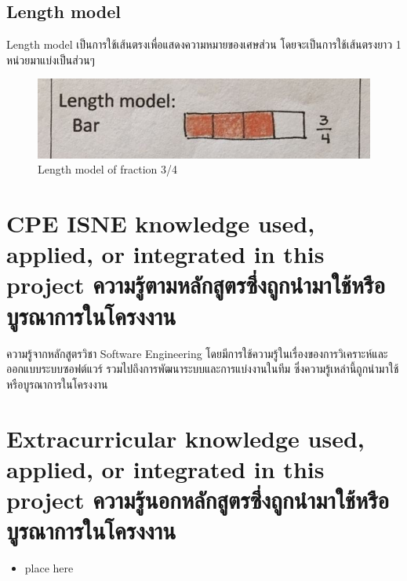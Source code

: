 \subsection{Length model}
Length model เป็นการใช้เส้นตรงเพื่อแสดงความหมายของเศษส่วน โดยจะเป็นการใช้เส้นตรงยาว 1 หน่วยมาแบ่งเป็นส่วนๆ
\begin{figure}[h!tbp]
\begin{center}
\includegraphics{Length_model.png}
\end{center}
\caption[Length model]{Length model of fraction 3/4}
\end{figure}




\section{\ifenglish%
\ifcpe CPE \else ISNE \fi knowledge used, applied, or integrated in this project
\else%
ความรู้ตามหลักสูตรซึ่งถูกนำมาใช้หรือบูรณาการในโครงงาน
\fi
}

ความรู้จากหลักสูตรวิชา Software Engineering โดยมีการใช้ความรู้ในเรื่องของการวิเคราะห์และออกแบบระบบซอฟต์แวร์ รวมไปถึงการพัฒนาระบบและการแบ่งงานในทีม ซึ่งความรู้เหล่านี้ถูกนำมาใช้หรือบูรณาการในโครงงาน

\section{\ifenglish%
Extracurricular knowledge used, applied, or integrated in this project
\else%
ความรู้นอกหลักสูตรซึ่งถูกนำมาใช้หรือบูรณาการในโครงงาน
\fi
}

\begin{itemize}
    \item place here
\end{itemize}
